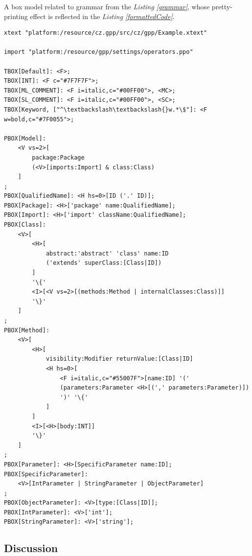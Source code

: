\documentclass[12pt,notitlepage,a4paper]{report}
\begin{document}
\begin{expl}\label{ParserRuleIdentifiers}
A box model related to grammar from the \textit{Listing \ref{grammar}}, whose pretty-printing effect is reflected in the \textit{Listing \ref{formattedCode}}. 
\begingroup
\fontsize{10pt}{12pt}
\begin{Verbatim}[commandchars=\\\{\}]
xtext "platform:/resource/cz.gpp/src/cz/gpp/Example.xtext"

import "platform:/resource/gpp/settings/operators.ppo"

TBOX[Default]: <F>;
TBOX[INT]: <F c="#7F7F7F">;
TBOX[ML_COMMENT]: <F i=italic,c="#00FF00">, <MC>;
TBOX[SL_COMMENT]: <F i=italic,c="#00FF00">, <SC>;
TBOX[Keyword, ["^\textbackslash\textbackslash{}w.*\$"]: <F w=bold,c="#7F0055">;

PBOX[Model]:
    <V vs=2>[
        package:Package
        (<V>[imports:Import] & class:Class)
    ]
;
PBOX[QualifiedName]: <H hs=0>[ID ('.' ID)];
PBOX[Package]: <H>['package' name:QualifiedName];
PBOX[Import]: <H>['import' className:QualifiedName];
PBOX[Class]:
    <V>[
        <H>[
            abstract:'abstract' 'class' name:ID
            ('extends' superClass:[Class|ID])
        ]
        '\{'
        <I>[<V vs=2>[(methods:Method | internalClasses:Class)]]
        '\}'
    ]
;
PBOX[Method]:
    <V>[
        <H>[
            visibility:Modifier returnValue:[Class|ID]
            <H hs=0>[
                <F i=italic,c="#55007F">[name:ID] '('
                (parameters:Parameter <H>[(',' parameters:Parameter)])
                ')' '\{'
            ]
        ]
        <I>[<H>[body:INT]]
        '\}'
    ]
;
PBOX[Parameter]: <H>[SpecificParameter name:ID];
PBOX[SpecificParameter]:
    <V>[IntParameter | StringParameter | ObjectParameter]
;
PBOX[ObjectParameter]: <V>[type:[Class|ID]];
PBOX[IntParameter]: <V>['int'];
PBOX[StringParameter]: <V>['string'];
\end{Verbatim}
\endgroup
\end{expl}

\subsection{Discussion}
\end{document}

